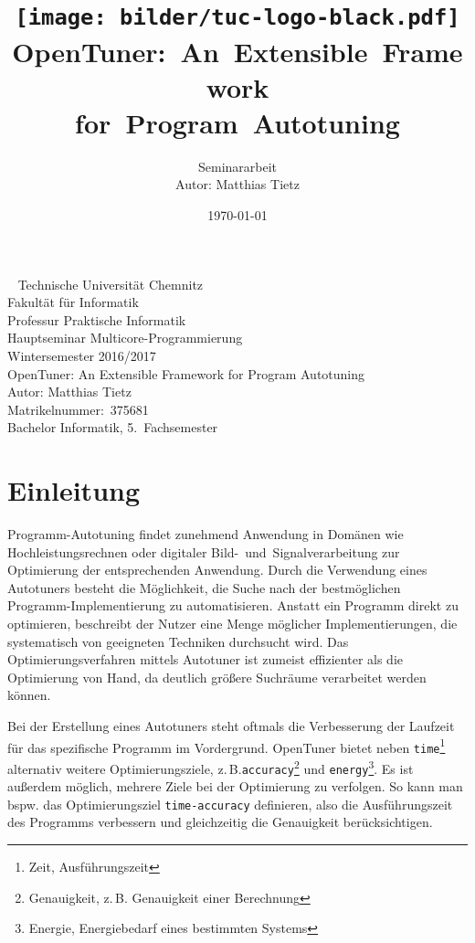 \documentclass[a4paper,11pt]{scrartcl}
\title{\texttt{[image: bilder/tuc-logo-black.pdf]}
    OpenTuner:~An~Extensible~Framework\\for~Program~Autotuning
}
\author{Seminararbeit\\Autor: Matthias Tietz}
\date{\today}
\newcommand{\zB}{\mbox{z.\,B.}\xspace}
\newcommand{\bspw}{\mbox{bspw.}\xspace}
\begin{document}
\maketitle \thispagestyle{empty} \newpage

\thispagestyle{empty}
~
\vfill
Technische Universität Chemnitz\\
Fakultät für Informatik\\
Professur Praktische Informatik\\
Hauptseminar Multicore-Programmierung\\
Wintersemester 2016/2017\\

OpenTuner: An Extensible Framework for Program Autotuning\\
Autor: Matthias Tietz\\
Matrikelnummer:~375681\\
Bachelor Informatik, 5.~Fachsemester

\newpage
\tableofcontents \newpage




\section{Einleitung}

Programm-Autotuning findet zunehmend Anwendung in Domänen wie Hochleistungsrechnen oder
digitaler Bild-~und~Signalverarbeitung zur Optimierung der entsprechenden Anwendung.
Durch die Verwendung eines Autotuners besteht die Möglichkeit, die Suche nach der
bestmöglichen Programm-Implementierung zu automatisieren. Anstatt ein Programm direkt
zu optimieren, beschreibt der Nutzer eine Menge möglicher Implementierungen, die 
systematisch von geeigneten Techniken durchsucht wird. Das Optimierungsverfahren
mittels Autotuner ist zumeist effizienter als die Optimierung von Hand, da deutlich größere
Suchräume verarbeitet werden können. \newline

Bei der Erstellung eines Autotuners steht oftmals die Verbesserung der Laufzeit
für das spezifische Programm im Vordergrund. OpenTuner bietet neben \texttt{time}\footnote{Zeit, Ausführungszeit}  
alternativ weitere Optimierungsziele, \zB \texttt{accuracy}\footnote{Genauigkeit, \zB Genauigkeit einer Berechnung}  
und \texttt{energy}\footnote{Energie, Energiebedarf eines bestimmten Systems}.
Es ist außerdem möglich, mehrere Ziele bei der Optimierung zu verfolgen. 
So kann man \bspw das Optimierungsziel \texttt{time-accuracy} definieren, also die Ausführungszeit
des Programms verbessern und gleichzeitig die Genauigkeit berücksichtigen. \newline
\end{document}
